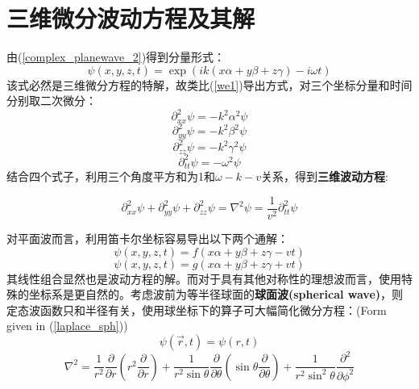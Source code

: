 \documentclass[12pt]{ctexart}%
\begin{document}
\section*{三维微分波动方程及其解}
由(\ref{complex_planewave_2})得到分量形式：
\begin{equation}
    \psi(x,y,z,t)=\exp(ik(x\alpha+y\beta+z\gamma)-i\omega t)
\end{equation}
该式必然是三维微分方程的特解，故类比(\ref{we1})导出方式，对三个坐标分量和时间分别取二次微分：
\begin{equation}
    \partial^2_{xx}\psi=-k^2\alpha^2\psi
\end{equation}
\begin{equation}
    \partial^2_{yy}\psi=-k^2\beta^2\psi
\end{equation}
\begin{equation}
    \partial^2_{zz}\psi=-k^2\gamma^2\psi
\end{equation}
\begin{equation}
    \partial^2_{tt}\psi=-\omega^2\psi
\end{equation}
结合四个式子，利用三个角度平方和为1和$\omega-k-v$关系，得到\textbf{三维波动方程}:
\begin{framed}
    \begin{equation}
        \partial^2_{xx}\psi+\partial^2_{yy}\psi+\partial^2_{zz}\psi=\nabla^2\psi=\frac{1}{v^2}\partial^2_{tt}\psi
    \end{equation}
\end{framed}
\par 对平面波而言，利用笛卡尔坐标容易导出以下两个通解：
\begin{equation}
    \psi(x,y,z,t)=f(x\alpha+y\beta+z\gamma-vt)
\end{equation}
\begin{equation}
    \psi(x,y,z,t)=g(x\alpha+y\beta+z\gamma+vt)
\end{equation}
其线性组合显然也是波动方程的解。而对于具有其他对称性的理想波而言，使用特殊的坐标系是更自然的。考虑波前为等半径球面的\textbf{球面波(spherical wave)}，则定态波函数只和半径有关，使用球坐标下的算子可大幅简化微分方程：(Form given in (\ref{laplace_sph}))
\begin{equation}
    \psi(\vec{r},t)=\psi(r,t)
\end{equation}
\begin{equation}
    \nabla^{2}= \frac{1}{r^{2}} \frac{\partial}{\partial r}\left(r^{2} \frac{\partial}{\partial r}\right)+\frac{1}{r^{2} \sin \theta} \frac{\partial}{\partial \theta}\left(\sin \theta \frac{\partial}{\partial \theta}\right)+\frac{1}{r^{2} \sin ^{2} \theta} \frac{\partial^{2}}{\partial \phi^{2}}
    \label{laplace_sph}
\end{equation}
\end{document}
